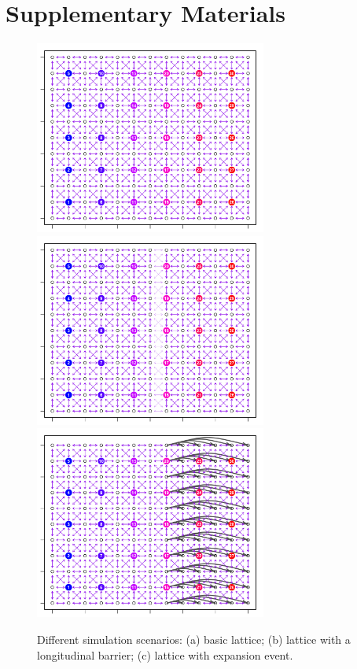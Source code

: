 \documentclass[12pt]{article}
\begin{document}
\newpage


\section*{Supplementary Materials}

\begin{figure}
	\centering
			{\includegraphics[width=3in,height=2.5in]{figs/sims/basic_lattice.png}}
			{\includegraphics[width=3in,height=2.5in]{figs/sims/barrier_lattice.png}}
			{\includegraphics[width=3in,height=2.5in]{figs/sims/expansion_lattice.png}}
	\caption{Different simulation scenarios: (a) basic lattice; (b) lattice with a longitudinal barrier; (c) lattice with expansion event.}\label{sfig:sim_scenarios}
\end{figure}
\end{document}
